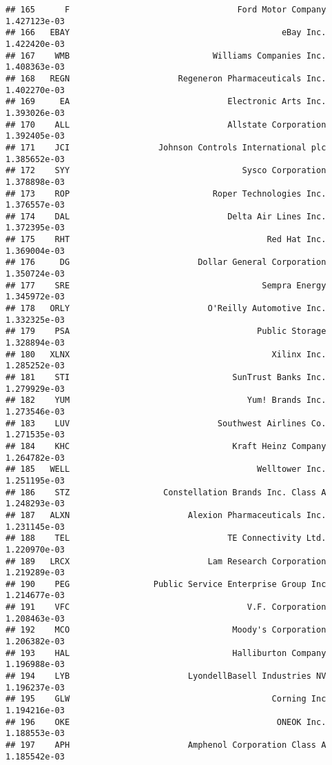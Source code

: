 \documentclass[
]{article}
\begin{document}
\begin{verbatim}
## 165      F                                  Ford Motor Company 1.427123e-03
## 166   EBAY                                           eBay Inc. 1.422420e-03
## 167    WMB                             Williams Companies Inc. 1.408363e-03
## 168   REGN                      Regeneron Pharmaceuticals Inc. 1.402270e-03
## 169     EA                                Electronic Arts Inc. 1.393026e-03
## 170    ALL                                Allstate Corporation 1.392405e-03
## 171    JCI                  Johnson Controls International plc 1.385652e-03
## 172    SYY                                   Sysco Corporation 1.378898e-03
## 173    ROP                             Roper Technologies Inc. 1.376557e-03
## 174    DAL                                Delta Air Lines Inc. 1.372395e-03
## 175    RHT                                        Red Hat Inc. 1.369004e-03
## 176     DG                          Dollar General Corporation 1.350724e-03
## 177    SRE                                       Sempra Energy 1.345972e-03
## 178   ORLY                            O'Reilly Automotive Inc. 1.332325e-03
## 179    PSA                                      Public Storage 1.328894e-03
## 180   XLNX                                         Xilinx Inc. 1.285252e-03
## 181    STI                                 SunTrust Banks Inc. 1.279929e-03
## 182    YUM                                    Yum! Brands Inc. 1.273546e-03
## 183    LUV                              Southwest Airlines Co. 1.271535e-03
## 184    KHC                                 Kraft Heinz Company 1.264782e-03
## 185   WELL                                      Welltower Inc. 1.251195e-03
## 186    STZ                   Constellation Brands Inc. Class A 1.248293e-03
## 187   ALXN                        Alexion Pharmaceuticals Inc. 1.231145e-03
## 188    TEL                                TE Connectivity Ltd. 1.220970e-03
## 189   LRCX                            Lam Research Corporation 1.219289e-03
## 190    PEG                 Public Service Enterprise Group Inc 1.214677e-03
## 191    VFC                                    V.F. Corporation 1.208463e-03
## 192    MCO                                 Moody's Corporation 1.206382e-03
## 193    HAL                                 Halliburton Company 1.196988e-03
## 194    LYB                        LyondellBasell Industries NV 1.196237e-03
## 195    GLW                                         Corning Inc 1.194216e-03
## 196    OKE                                          ONEOK Inc. 1.188553e-03
## 197    APH                        Amphenol Corporation Class A 1.185542e-03

\end{verbatim}
\end{document}
